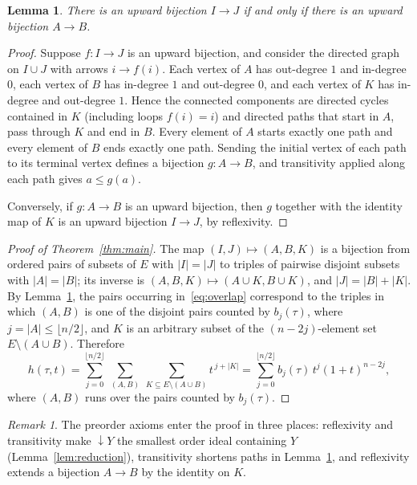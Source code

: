 \documentclass[11pt]{amsart}
\newtheorem{lemma}[theorem]{Lemma}
\theoremstyle{definition}
\theoremstyle{remark}
\newtheorem{remark}[theorem]{Remark}
\numberwithin{equation}{section}
\newcommand{\down}{{\downarrow}}
\begin{document}
\begin{lemma}\label{lem:cancel}
There is an upward bijection $I\to J$ if and only if there is an upward bijection $A\to B$.
\end{lemma}

\begin{proof}
Suppose $f\colon I\to J$ is an upward bijection, and consider the directed graph on $I\cup J$ with arrows $i\to f(i)$. Each vertex of $A$ has out-degree $1$ and in-degree $0$, each vertex of $B$ has in-degree $1$ and out-degree $0$, and each vertex of $K$ has in-degree and out-degree $1$. Hence the connected components are directed cycles contained in $K$ (including loops $f(i)=i$) and directed paths that start in $A$, pass through $K$ and end in $B$. Every element of $A$ starts exactly one path and every element of $B$ ends exactly one path. Sending the initial vertex of each path to its terminal vertex defines a bijection $g\colon A\to B$, and transitivity applied along each path gives $a\le g(a)$.

Conversely, if $g\colon A\to B$ is an upward bijection, then $g$ together with the identity map of $K$ is an upward bijection $I\to J$, by reflexivity.
\end{proof}

\begin{proof}[Proof of Theorem~\ref{thm:main}]
The map $(I,J)\mapsto (A,B,K)$ is a bijection from ordered pairs of subsets of $E$ with $|I|=|J|$ to triples of pairwise disjoint subsets with $|A|=|B|$; its inverse is $(A,B,K)\mapsto(A\cup K,B\cup K)$, and $|J|=|B|+|K|$. By Lemma~\ref{lem:cancel}, the pairs occurring in~\eqref{eq:overlap} correspond to the triples in which $(A,B)$ is one of the disjoint pairs counted by $b_j(\tau)$, where $j=|A|\le\lfloor n/2\rfloor$, and $K$ is an arbitrary subset of the $(n-2j)$-element set $E\setminus(A\cup B)$. Therefore
\[
h(\tau,t)=\sum_{j=0}^{\lfloor n/2\rfloor}\ \sum_{(A,B)} \ \sum_{K\subseteq E\setminus(A\cup B)} t^{\,j+|K|}
=\sum_{j=0}^{\lfloor n/2\rfloor} b_j(\tau)\,t^j(1+t)^{n-2j},
\]
where $(A,B)$ runs over the pairs counted by $b_j(\tau)$.
\end{proof}

\begin{remark}\label{rem:axioms}
The preorder axioms enter the proof in three places: reflexivity and transitivity make $\down Y$ the smallest order ideal containing $Y$ (Lemma~\ref{lem:reduction}), transitivity shortens paths in Lemma~\ref{lem:cancel}, and reflexivity extends a bijection $A\to B$ by the identity on $K$.
\end{remark}
\end{document}
